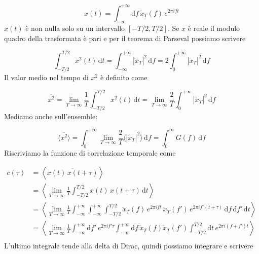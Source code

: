 \documentclass[a4paper]{report}
\begin{document}
\begin{equation}
    x(t) = \int_{-\infty}^{+\infty} \mathrm{d}f \,\tilde{x}_T(f)\,e^{2\pi i f t}
\end{equation}
$x(t)$ è non nulla solo su un intervallo $[-T/2, T/2]$. Se $x$ è reale il modulo quadro della trasformata è pari e per il teorema di Parseval possiamo scrivere

\begin{equation}
    \int_{-T/2}^{T/2} x^2(t) \,\mathrm{d}t = \int_{-\infty}^{+\infty} |\tilde{x}_T|^2 \,\mathrm{d}f = 2 \int_{0}^{+\infty} |\tilde{x}_T|^2 \,\mathrm{d}f
\end{equation}
Il valor medio nel tempo di $x^2$ è definito come

\begin{equation}
    \overline{x^2} = \lim_{T\to\infty} \frac{1}{T} \int_{-T/2}^{T/2} x^2(t) \,\mathrm{d}t = \lim_{T\to\infty} \frac{2}{T}  \int_{0}^{+\infty} |\tilde{x}_T|^2 \,\mathrm{d}f
\end{equation}
Mediamo anche sull'ensemble:

\begin{equation}
    \langle \overline{x^2} \rangle = \int_{0}^{+\infty} \lim_{T\to\infty} \frac{2}{T}   \langle|\tilde{x}_T|^2\rangle \,\mathrm{d}f = \int_{0}^{\infty} G(f) \,\mathrm{d}f
\end{equation}
Riscriviamo la funzione di correlazione temporale come

\begin{equation}
\begin{split}
    c(\tau) & = \left\langle \overline{x(t)\,x(t+\tau) } \right\rangle \\
    & = \left\langle \lim_{T\to\infty} \frac{1}{T} \int_{-T/2}^{T/2} x(t)\,x(t+\tau) \,\mathrm{d}t \right\rangle \\
    & = \left\langle \lim_{T\to\infty} \frac{1}{T} \int_{-\infty}^{+\infty} \int_{-\infty}^{+\infty}  \int_{-T/2}^{T/2} \tilde{x}_T(f)\,e^{2\pi i f t}\,\tilde{x}_T(f') \,e^{2\pi i f' (t+\tau)}\,\mathrm{d}f\,\mathrm{d}f'\,\mathrm{d}t \right\rangle \\
    & =  \left\langle\lim_{T\to\infty} \frac{1}{T}  \int_{-\infty}^{+\infty} \mathrm{d}f'\,e^{2\pi i f' \tau} \int_{-\infty}^{+\infty} \mathrm{d}f\, \tilde{x}_T(f)\tilde{x}_T(f')\int_{-T/2}^{T/2}\mathrm{d}t\, e^{2\pi i (f+f')t} \right\rangle \\
\end{split}
\end{equation}
L'ultimo integrale tende alla delta di Dirac, quindi possiamo integrare e scrivere
\end{document}
